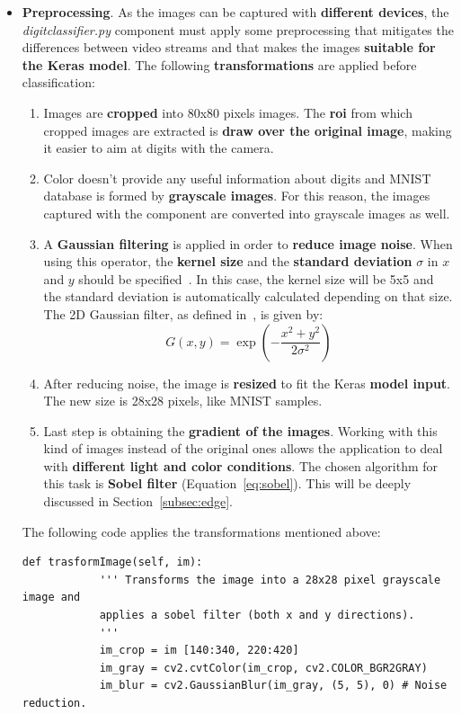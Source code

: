 \begin{itemize}
	\item \textbf{Preprocessing}. As the images can be captured with \textbf{different devices}, the \textit{digitclassifier.py} component must apply some preprocessing that mitigates the differences between video streams and that makes the images \textbf{suitable for the Keras model}. The following \textbf{transformations} are applied before classification:
	\begin{enumerate}
		\item Images are \textbf{cropped} into 80x80 pixels images. The \textbf{\gls{roi}} from which cropped images are extracted is \textbf{draw over the original image}, making it easier to aim at digits with the camera.
		\item Color doesn't provide any useful information about digits and MNIST database is formed by \textbf{grayscale images}. For this reason, the images captured with the component are converted into grayscale images as well. 
		\item A \textbf{Gaussian filtering} is applied in order to \textbf{reduce image noise}. When using this operator, the \textbf{kernel size} and the \textbf{standard deviation} $\sigma$ in $x$ and $y$ should be specified~\cite{itseez2014theopencv}. In this case, the kernel size will be 5x5 and the standard deviation is automatically calculated depending on that size. The 2D Gaussian filter, as defined in~\cite{sonka1999image}, is given by:
		\begin{equation}
		G(x,y)=\exp(-\frac{x^2+y^2}{2\sigma^2})
		\end{equation}
		\item After reducing noise, the image is \textbf{resized} to fit the Keras \textbf{model input}. The new size is 28x28 pixels, like MNIST samples.
		\item Last step is obtaining the \textbf{gradient of the images}. Working with this kind of images instead of the original ones allows the application to deal with \textbf{different light and color conditions}. The chosen algorithm for this task is \textbf{Sobel filter} (Equation~\ref{eq:sobel}). This will be deeply discussed in Section~\ref{subsec:edge}.
	\end{enumerate}
	
	The following code applies the transformations mentioned above:
	\begin{lstlisting}[frame=single]
		def trasformImage(self, im):
			''' Transforms the image into a 28x28 pixel grayscale image and
			applies a sobel filter (both x and y directions).
			''' 
			im_crop = im [140:340, 220:420]
			im_gray = cv2.cvtColor(im_crop, cv2.COLOR_BGR2GRAY)
			im_blur = cv2.GaussianBlur(im_gray, (5, 5), 0) # Noise reduction.
			

\end{lstlisting}
\end{itemize}
